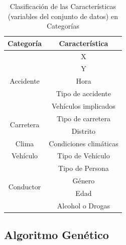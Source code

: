 


\begin{table}[H]
	\centering
	
	\begin{tabular}{ |c|c| }
		\hline
		\textbf{Categoría} & \textbf{Característica} \\
		\hline
		\hline
		\multirow{5}{*}{Accidente} & X \\
		& Y \\
		& Hora \\
		& Tipo de accidente \\
		& Vehículos implicados \\
		\hline
		\hline
		\multirow{2}{*}{Carretera} & Tipo de carretera \\
		& Distrito \\
		\hline
		\hline
		Clima & Condiciones climáticas \\
		\hline
		\hline
		Vehículo & Tipo de Vehículo \\
		\hline
		\hline
		\multirow{4}{*}{Conductor}  & Tipo de Persona \\
		& Género \\
		& Edad \\
		& Alcohol o Drogas \\
		\hline
		\hline
	\end{tabular}
	
	\caption{Clasificación de las Características (variables del conjunto de datos) en Categorías}
	\label{JC}
\end{table}



\subsection*{Algoritmo Genético}



